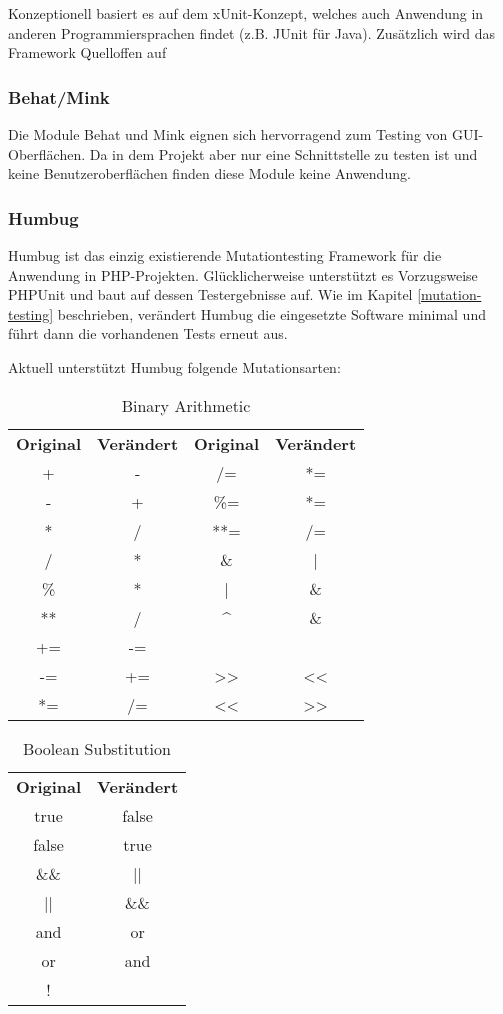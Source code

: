 Konzeptionell basiert es auf dem xUnit-Konzept, welches auch Anwendung in anderen Programmiersprachen findet (z.B. JUnit für Java). Zusätzlich wird das Framework Quelloffen auf 

\subsubsection{Behat/Mink}
Die Module Behat und Mink eignen sich hervorragend zum Testing von GUI-Oberflächen. Da in dem Projekt aber nur eine Schnittstelle zu testen ist und keine Benutzeroberflächen finden diese Module keine Anwendung. 

\subsubsection{Humbug}
Humbug ist das einzig existierende Mutationtesting Framework für die Anwendung in PHP-Projekten. Glücklicherweise unterstützt es Vorzugsweise PHPUnit und baut auf dessen Testergebnisse auf. Wie im Kapitel \ref*{mutation-testing} beschrieben, verändert Humbug die eingesetzte Software minimal und führt dann die vorhandenen Tests erneut aus. 

Aktuell unterstützt Humbug folgende Mutationsarten:
\begin{table}[H]
 	 \caption{Binary Arithmetic}
 \begin{tabular}{cccc}
 	\textbf{Original} & \textbf{Verändert} & \textbf{Original} & \textbf{Verändert} \\
 	+ & - & /= & *= \\
 	- & + & \%= & *= \\
 	* & / & **= & /= \\
 	/ & * & \& & | \\
 	\% & * & | & \& \\
 	** & / & \textasciicircum & \& \\
 	+= & -= & ~ &  \\
 	-= & += & >> & << \\ 	 	 	 	 	 	
 	*= & /= & << & >> \\ 	 	 	 	 	 	
 \end{tabular}
\end{table}


\begin{table}[h]
	\caption{Boolean Substitution}
	\begin{tabular}{cc}
		\textbf{Original} & \textbf{Verändert} \\
		true & false \\
		false & true \\
		\&\& & || \\
		|| & \&\& \\
		and & or \\
		or & and \\
		! & \\
	\end{tabular}
\end{table}

